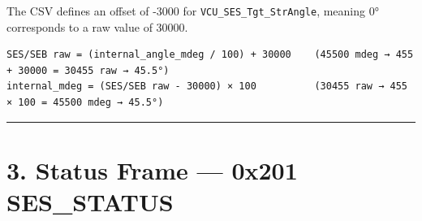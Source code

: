 \documentclass[12pt,a4paper,oneside]{report}
\begin{document}
The CSV defines an offset of -3000 for \texttt{VCU\_SES\_Tgt\_StrAngle}, meaning
0° corresponds to a raw value of 30000.

\begin{verbatim}
SES/SEB raw = (internal_angle_mdeg / 100) + 30000    (45500 mdeg → 455 + 30000 = 30455 raw → 45.5°)
internal_mdeg = (SES/SEB raw - 30000) × 100          (30455 raw → 455 × 100 = 45500 mdeg → 45.5°)
\end{verbatim}

\begin{center}\rule{0.5\linewidth}{0.5pt}\end{center}

\section{3. Status Frame --- 0x201
SES\_STATUS}\label{status-frame-0x201-ses_status}
\end{document}
